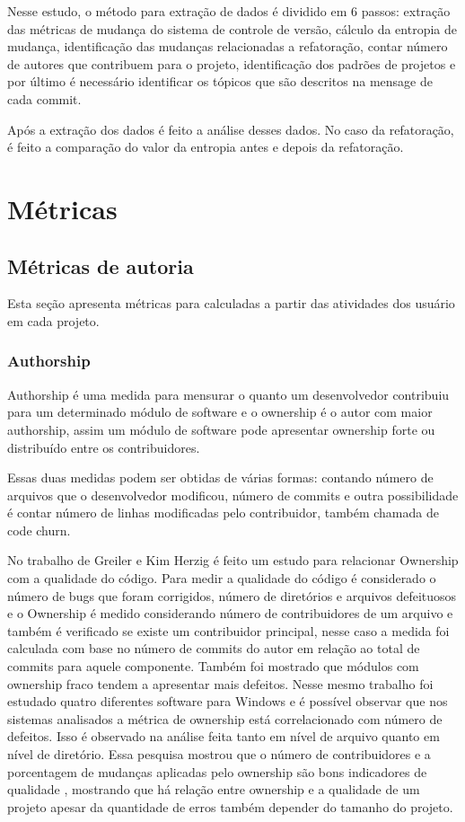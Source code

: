 Nesse estudo, o método para extração de dados é dividido em 6 passos: extração das métricas de mudança do sistema de controle de versão, cálculo da entropia de mudança, identificação das mudanças relacionadas a refatoração, contar número de autores que contribuem para o projeto, identificação dos padrões de projetos e por último é necessário identificar os tópicos que são descritos na mensage de cada commit. 

Após a extração dos dados é feito a análise desses dados. No caso da refatoração, é feito a comparação do valor da entropia antes e depois da refatoração.

\section{Métricas}
\subsection{Métricas de autoria}
Esta seção apresenta métricas para calculadas a partir das atividades dos usuário em cada projeto.

\subsubsection{Authorship}
Authorship é uma medida para mensurar o quanto um desenvolvedor contribuiu para um determinado módulo de software e o ownership é o autor com maior authorship, assim um módulo de software pode apresentar ownership forte ou distribuído entre os contribuidores.

Essas duas medidas podem ser obtidas de várias formas: contando número de arquivos que o desenvolvedor modificou, número de commits e outra possibilidade é contar número de linhas modificadas pelo contribuidor, também chamada de code churn\cite{Munson:1998:CCM:850947.853326}.

No trabalho de Greiler e Kim Herzig\cite{Greiler} é feito um estudo para relacionar Ownership com a qualidade do código. Para medir a qualidade do código é considerado o número de bugs que foram corrigidos, número de diretórios e arquivos defeituosos e o Ownership é medido considerando número de contribuidores de um arquivo e também é verificado se existe um contribuidor principal, nesse caso a medida foi calculada com base no número de commits do autor em relação ao total de commits para aquele componente. Também foi mostrado que módulos com ownership fraco tendem a apresentar mais defeitos. Nesse mesmo trabalho foi estudado quatro diferentes software para Windows e é possível observar que nos sistemas analisados a métrica de ownership está correlacionado com número de defeitos. Isso é observado na análise feita tanto em nível de arquivo quanto em nível de diretório.  
Essa pesquisa mostrou que o número de contribuidores e a porcentagem de mudanças aplicadas pelo ownership são bons indicadores de qualidade , mostrando que há relação entre ownership e a qualidade de um projeto apesar da quantidade de erros também depender do tamanho do projeto.

